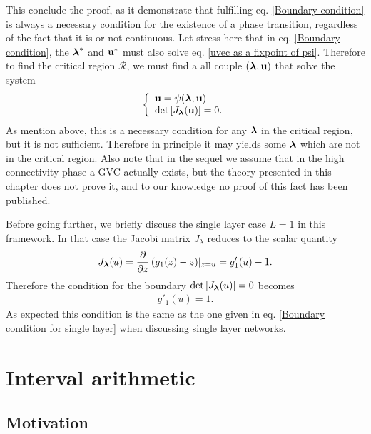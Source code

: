 \documentclass[
11pt, %
american, %
singlespacing, %
final, %
nolistspacing, %
liststotoc, %
headsepline, %
]{MastersDoctoralThesis} %
\begin{document}
This conclude the proof, as it demonstrate that fulfilling eq. \eqref{Boundary condition} is always a necessary condition for the existence of a phase transition, regardless of the fact that it is or not continuous. Let stress here that in eq. \eqref{Boundary condition}, the $\boldsymbol{\mathrm{\lambda}}^*$ and $\boldsymbol{\mathrm{u}}^*$ must also solve eq. \eqref{uvec as a fixpoint of psi}. Therefore to find the critical region $\mathcal{R}$, we must find a all couple $(\boldsymbol{\mathrm{\lambda}}, \boldsymbol{\mathrm{u}})$ that solve the system
\begin{align}
	\left\{ \begin{array}{l} \boldsymbol{\mathrm{u}} = \psi(\boldsymbol{\mathrm{\lambda}}, \boldsymbol{\mathrm{u}}) \\ \det\left[ J_{\boldsymbol{\mathrm{\lambda}}}(\boldsymbol{\mathrm{u}}) \right] = 0. \end{array} \right. \label{Boundary condition full system}
\end{align}
As mention above, this is a necessary condition for any $\boldsymbol{\mathrm{\lambda}}$ in the critical region, but it is not sufficient. Therefore in principle it may yields some $\boldsymbol{\mathrm{\lambda}}$ which are not in the critical region. Also note that in the sequel we assume that in the high connectivity phase a GVC actually exists, but the theory presented in this chapter does not prove it, and to our knowledge no proof of this fact has been published.

Before going further, we briefly discuss the single layer case $L = 1$ in this framework. In that case the Jacobi matrix $J_{\lambda}$ reduces to the scalar quantity
\begin{align}
	J_{\boldsymbol{\mathrm{\lambda}}}(u) = \frac{\partial}{\partial z} \left(g_1(z) - z\right)\rvert_{z = u} = g'_1(u) - 1.
\end{align}
Therefore the condition for the boundary $\det \left[ J_{\boldsymbol{\mathrm{\lambda}}}(u)\right] = 0$ becomes
\begin{align}
	g'_1(u) = 1.
\end{align}
As expected this condition is the same as the one given in eq. \eqref{Boundary condition for single layer} when discussing single layer networks.

\section{Interval arithmetic}
\label{Section: Interval arithemetic}

\subsection{Motivation}
\end{document}
